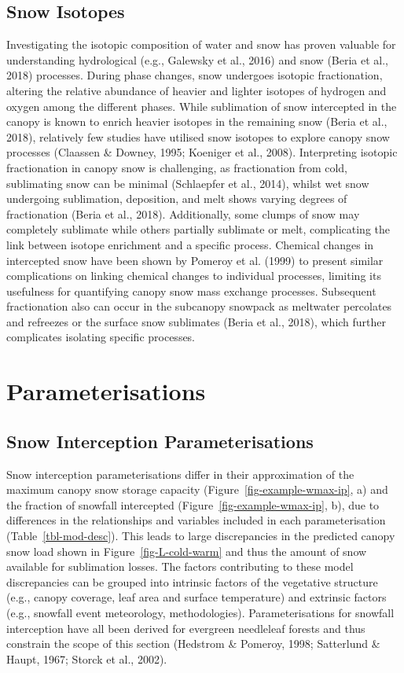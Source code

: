 \documentclass[
  letterpaper,
]{tex/uofsthesis-cs}
\begin{document}
\subsection{Snow Isotopes}\label{snow-isotopes}

Investigating the isotopic composition of water and snow has proven
valuable for understanding hydrological (e.g., Galewsky et al., 2016)
and snow (Beria et al., 2018) processes. During phase changes, snow
undergoes isotopic fractionation, altering the relative abundance of
heavier and lighter isotopes of hydrogen and oxygen among the different
phases. While sublimation of snow intercepted in the canopy is known to
enrich heavier isotopes in the remaining snow (Beria et al., 2018),
relatively few studies have utilised snow isotopes to explore canopy
snow processes (Claassen \& Downey, 1995; Koeniger et al., 2008).
Interpreting isotopic fractionation in canopy snow is challenging, as
fractionation from cold, sublimating snow can be minimal (Schlaepfer et
al., 2014), whilst wet snow undergoing sublimation, deposition, and melt
shows varying degrees of fractionation (Beria et al., 2018).
Additionally, some clumps of snow may completely sublimate while others
partially sublimate or melt, complicating the link between isotope
enrichment and a specific process. Chemical changes in intercepted snow
have been shown by Pomeroy et al. (1999) to present similar
complications on linking chemical changes to individual processes,
limiting its usefulness for quantifying canopy snow mass exchange
processes. Subsequent fractionation also can occur in the subcanopy
snowpack as meltwater percolates and refreezes or the surface snow
sublimates (Beria et al., 2018), which further complicates isolating
specific processes.

\section{Parameterisations}\label{sec-parameterisations}

\subsection{Snow Interception Parameterisations}\label{sec-interception}

Snow interception parameterisations differ in their approximation of the
maximum canopy snow storage capacity (Figure~\ref{fig-example-wmax-ip},
a) and the fraction of snowfall intercepted
(Figure~\ref{fig-example-wmax-ip}, b), due to differences in the
relationships and variables included in each parameterisation
(Table~\ref{tbl-mod-desc}). This leads to large discrepancies in the
predicted canopy snow load shown in Figure~\ref{fig-L-cold-warm} and
thus the amount of snow available for sublimation losses. The factors
contributing to these model discrepancies can be grouped into intrinsic
factors of the vegetative structure (e.g., canopy coverage, leaf area
and surface temperature) and extrinsic factors (e.g., snowfall event
meteorology, methodologies). Parameterisations for snowfall interception
have all been derived for evergreen needleleaf forests and thus
constrain the scope of this section (Hedstrom \& Pomeroy, 1998;
Satterlund \& Haupt, 1967; Storck et al., 2002).
\end{document}
